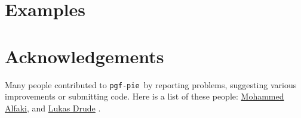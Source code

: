 \documentclass{ltxdoc}
\newcommand\pgfpiename{\texttt{pgf-pie}}
\begin{document}
\codeexample[scale=0.25,from file={demo/cloud.tex}]

\section{Examples}


\section{Acknowledgements}
Many people contributed to \pgfpiename\ by reporting problems,
suggesting various improvements or submitting code. Here is a list of
these people:
\href{mailto:mohammed.alfaki@ii.uib.no}{Mohammed Alfaki},
and
\href{mailto:ldrude@mail.uni-paderborn.de}{Lukas Drude}
.
                                              
\end{document}
